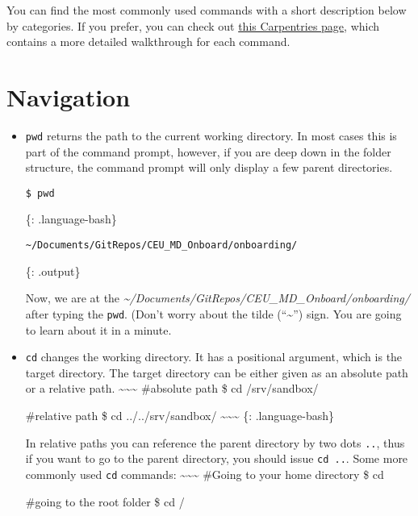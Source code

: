 \documentclass[
]{book}
\begin{document}
You can find the most commonly used commands with a short description below by categories. If you prefer, you can check out \href{https://datacarpentry.org/shell-economics/}{this Carpentries page}, which contains a more detailed walkthrough for each command.

\hypertarget{navigation}{%
\section{Navigation}\label{navigation}}

\begin{itemize}
\item
  \texttt{pwd} returns the path to the current working directory. In most cases this is part of the command prompt, however, if you are deep down in the folder structure, the command prompt will only display a few parent directories.

\begin{verbatim}
$ pwd
\end{verbatim}

  \{: .language-bash\}

\begin{verbatim}
~/Documents/GitRepos/CEU_MD_Onboard/onboarding/
\end{verbatim}

  \{: .output\}

  Now, we are at the \emph{\textasciitilde/Documents/GitRepos/CEU\_MD\_Onboard/onboarding/} after typing the \texttt{pwd}. (Don't worry about the tilde (``\textasciitilde{}'') sign. You are going to learn about it in a minute.
\item
  \texttt{cd} changes the working directory. It has a positional argument, which is the target directory. The target directory can be either given as an absolute path or a relative path.
  \textasciitilde\textasciitilde\textasciitilde{}
  \#absolute path
  \$ cd /srv/sandbox/

  \#relative path
  \$ cd ../../srv/sandbox/
  \textasciitilde\textasciitilde\textasciitilde{}
  \{: .language-bash\}

  In relative paths you can reference the parent directory by two dots \texttt{..}, thus if you want to go to the parent directory, you should issue \texttt{cd\ ..}. Some more commonly used \texttt{cd} commands:
  \textasciitilde\textasciitilde\textasciitilde{}
  \#Going to your home directory
  \$ cd

  \#going to the root folder
  \$ cd /


\end{itemize}
\end{document}
